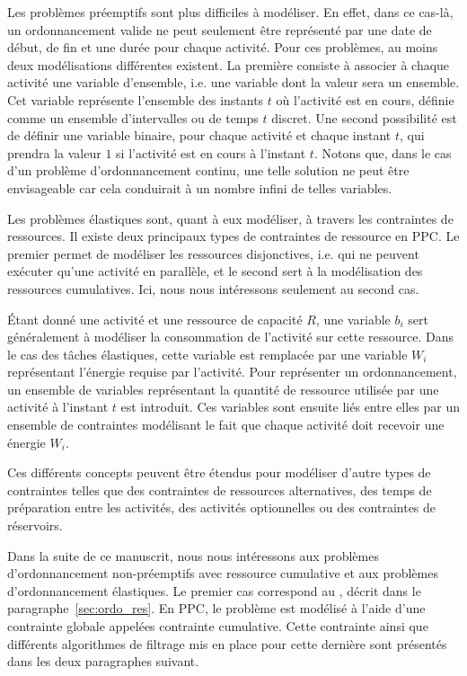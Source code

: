 Les problèmes préemptifs sont plus difficiles à modéliser. En effet,
dans ce cas-là, un ordonnancement valide ne peut seulement être
représenté par une date de début, de fin et une durée pour chaque
activité. Pour ces problèmes, au moins deux modélisations différentes
existent. La première consiste à associer à chaque activité une
variable d'ensemble, i.e. une variable dont la valeur sera un
ensemble. Cet variable représente l'ensemble des instants $t$ où
l'activité est en cours, définie comme un ensemble d'intervalles ou de
temps $t$ discret. Une second possibilité est de définir une variable
binaire, pour chaque activité et chaque instant $t$, qui prendra la
valeur $1$ si l'activité est en cours à l'instant $t$. Notons que,
dans le cas d'un problème d'ordonnancement continu, une telle solution
ne peut être envisageable car cela conduirait à un nombre infini de
telles variables.

Les problèmes élastiques sont, quant à eux modéliser, à travers les
contraintes de ressources. Il existe deux principaux types de
contraintes de ressource en PPC. Le premier permet de modéliser les
ressources disjonctives, i.e. qui ne peuvent exécuter qu'une activité
en parallèle, et le second sert à la modélisation des ressources
cumulatives. Ici, nous nous intéressons seulement au second cas.

{\'E}tant donné une activité et une ressource de capacité $R$, une
variable $b_i$ sert généralement à modéliser la consommation de
l'activité sur cette ressource. Dans le cas des tâches élastiques,
cette variable est remplacée par une variable $W_i$ représentant
l'énergie requise par l'activité. Pour représenter un ordonnancement,
un ensemble de variables représentant la quantité de ressource
utilisée par une activité à l'instant $t$ est introduit. Ces variables
sont ensuite liés entre elles par un ensemble de contraintes
modélisant le fait que chaque activité doit recevoir une énergie
$W_i$. 

Ces différents concepts peuvent être étendus pour modéliser d'autre
types de contraintes telles que des contraintes de ressources
alternatives, des temps de préparation entre les activités, des
activités optionnelles ou des contraintes de réservoirs.

Dans la suite de ce manuscrit, nous nous intéressons aux problèmes
d'ordonnancement non-préemptifs avec ressource cumulative et aux
problèmes d'ordonnancement élastiques. Le premier cas correspond au
\CUSP, décrit dans le paragraphe~\ref{sec:ordo_res}. En PPC, le
problème est modélisé à l'aide d'une contrainte globale appelées
contrainte cumulative. Cette contrainte ainsi que différents
algorithmes de filtrage mis en place pour cette dernière sont
présentés dans les deux paragraphes suivant. 

